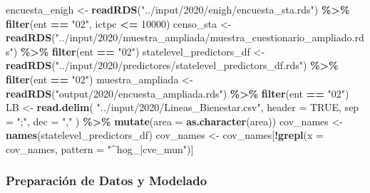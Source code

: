 \documentclass[
  12pt,
]{book}
\newenvironment{Shaded}{\begin{snugshade}}{\end{snugshade}}
\newcommand{\AttributeTok}[1]{\textcolor[rgb]{0.13,0.29,0.53}{#1}}
\newcommand{\ConstantTok}[1]{\textcolor[rgb]{0.56,0.35,0.01}{#1}}
\newcommand{\DecValTok}[1]{\textcolor[rgb]{0.00,0.00,0.81}{#1}}
\newcommand{\FunctionTok}[1]{\textcolor[rgb]{0.13,0.29,0.53}{\textbf{#1}}}
\newcommand{\NormalTok}[1]{#1}
\newcommand{\OtherTok}[1]{\textcolor[rgb]{0.56,0.35,0.01}{#1}}
\newcommand{\SpecialCharTok}[1]{\textcolor[rgb]{0.81,0.36,0.00}{\textbf{#1}}}
\newcommand{\StringTok}[1]{\textcolor[rgb]{0.31,0.60,0.02}{#1}}
\begin{document}
\begin{Shaded}
\begin{Highlighting}[]
\NormalTok{encuesta\_enigh }\OtherTok{\textless{}{-}} \FunctionTok{readRDS}\NormalTok{(}\StringTok{"../input/2020/enigh/encuesta\_sta.rds"}\NormalTok{) }\SpecialCharTok{\%\textgreater{}\%} 
  \FunctionTok{filter}\NormalTok{(ent }\SpecialCharTok{==} \StringTok{"02"}\NormalTok{, ictpc }\SpecialCharTok{\textless{}=} \DecValTok{10000}\NormalTok{)}
\NormalTok{censo\_sta }\OtherTok{\textless{}{-}} \FunctionTok{readRDS}\NormalTok{(}\StringTok{"../input/2020/muestra\_ampliada/muestra\_cuestionario\_ampliado.rds"}\NormalTok{) }\SpecialCharTok{\%\textgreater{}\%} 
  \FunctionTok{filter}\NormalTok{(ent }\SpecialCharTok{==} \StringTok{"02"}\NormalTok{)}
\NormalTok{statelevel\_predictors\_df }\OtherTok{\textless{}{-}} \FunctionTok{readRDS}\NormalTok{(}\StringTok{"../input/2020/predictores/statelevel\_predictors\_df.rds"}\NormalTok{) }\SpecialCharTok{\%\textgreater{}\%} 
  \FunctionTok{filter}\NormalTok{(ent }\SpecialCharTok{==} \StringTok{"02"}\NormalTok{)}
\NormalTok{muestra\_ampliada }\OtherTok{\textless{}{-}} \FunctionTok{readRDS}\NormalTok{(}\StringTok{"output/2020/encuesta\_ampliada.rds"}\NormalTok{) }\SpecialCharTok{\%\textgreater{}\%} 
  \FunctionTok{filter}\NormalTok{(ent }\SpecialCharTok{==} \StringTok{"02"}\NormalTok{)}
\NormalTok{LB }\OtherTok{\textless{}{-}}
  \FunctionTok{read.delim}\NormalTok{(}
    \StringTok{"../input/2020/Lineas\_Bienestar.csv"}\NormalTok{,}
    \AttributeTok{header =} \ConstantTok{TRUE}\NormalTok{,}
    \AttributeTok{sep =} \StringTok{";"}\NormalTok{,}
    \AttributeTok{dec =} \StringTok{","}
\NormalTok{  ) }\SpecialCharTok{\%\textgreater{}\%} \FunctionTok{mutate}\NormalTok{(}\AttributeTok{area =} \FunctionTok{as.character}\NormalTok{(area))}
\NormalTok{cov\_names }\OtherTok{\textless{}{-}} \FunctionTok{names}\NormalTok{(statelevel\_predictors\_df)}
\NormalTok{cov\_names }\OtherTok{\textless{}{-}}\NormalTok{ cov\_names[}\SpecialCharTok{!}\FunctionTok{grepl}\NormalTok{(}\AttributeTok{x =}\NormalTok{ cov\_names, }\AttributeTok{pattern =} \StringTok{"\^{}hog\_|cve\_mun"}\NormalTok{)]}
\end{Highlighting}
\end{Shaded}

\hypertarget{preparaciuxf3n-de-datos-y-modelado}{%
\subsubsection*{Preparación de Datos y Modelado}\label{preparaciuxf3n-de-datos-y-modelado}}
\end{document}
